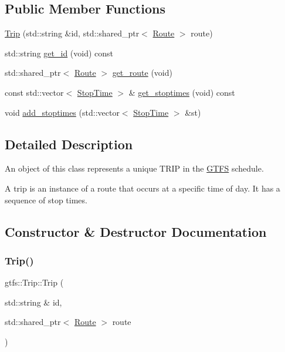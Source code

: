 \subsection*{Public Member Functions}
\begin{DoxyCompactItemize}
\item 
\hyperlink{classgtfs_1_1Trip_a3014ee32fdb5abd550ad20088c91aae6}{Trip} (std\+::string \&id, std\+::shared\+\_\+ptr$<$ \hyperlink{classgtfs_1_1Route}{Route} $>$ route)
\item 
std\+::string \hyperlink{classgtfs_1_1Trip_ac4c80cbf34f7c715104cc1c33b082f58}{get\+\_\+id} (void) const
\item 
std\+::shared\+\_\+ptr$<$ \hyperlink{classgtfs_1_1Route}{Route} $>$ \hyperlink{classgtfs_1_1Trip_a2b6cc135946d7e7db7bb35951987e35c}{get\+\_\+route} (void)
\item 
const std\+::vector$<$ \hyperlink{structgtfs_1_1StopTime}{Stop\+Time} $>$ \& \hyperlink{classgtfs_1_1Trip_a6b9d68b9d1c6942b839cd8599ed6a339}{get\+\_\+stoptimes} (void) const
\item 
void \hyperlink{classgtfs_1_1Trip_a2a756ff7d8e17f4eaa520f6314b5bb07}{add\+\_\+stoptimes} (std\+::vector$<$ \hyperlink{structgtfs_1_1StopTime}{Stop\+Time} $>$ \&st)
\end{DoxyCompactItemize}


\subsection{Detailed Description}
An object of this class represents a unique T\+R\+IP in the \hyperlink{classgtfs_1_1GTFS}{G\+T\+FS} schedule.

A trip is an instance of a route that occurs at a specific time of day. It has a sequence of stop times. 

\subsection{Constructor \& Destructor Documentation}
\mbox{\label{classgtfs_1_1Trip_a3014ee32fdb5abd550ad20088c91aae6}} 
\subsubsection{\texorpdfstring{Trip()}{Trip()}}
{\footnotesize\ttfamily gtfs\+::\+Trip\+::\+Trip (\begin{DoxyParamCaption}\item[{std\+::string \&}]{id,  }\item[{std\+::shared\+\_\+ptr$<$ \hyperlink{classgtfs_1_1Route}{Route} $>$}]{route }\end{DoxyParamCaption})}

